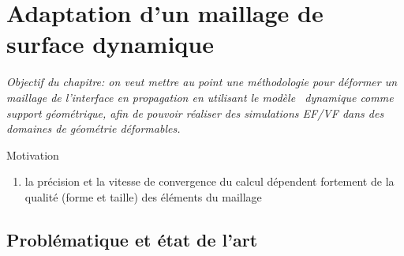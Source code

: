 \chapter{Adaptation d'un maillage de surface dynamique}

\textit{Objectif du chapitre: on veut mettre au point une méthodologie pour déformer un maillage de l'interface en propagation en utilisant le modèle \brep\ dynamique comme support géométrique, afin de pouvoir réaliser des simulations EF/VF dans des domaines de géométrie déformables.}

\par\bigskip

Motivation
\begin{enumerate}
	\item la précision et la vitesse de convergence du calcul dépendent fortement de la qualité (forme et taille) des éléments du maillage
\end{enumerate}

\section{Problématique et état de l'art}

